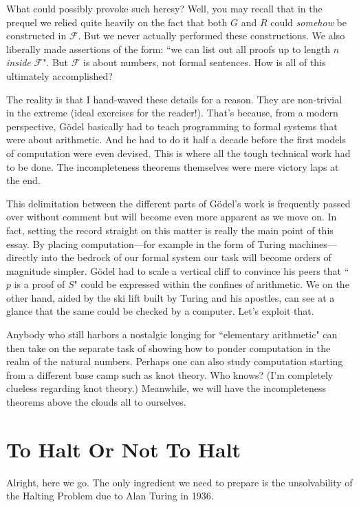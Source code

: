 \documentclass{article}
\newcommand{\F}{\ensuremath{\mathcal{F}}}
\begin{document}
What could possibly provoke such heresy? Well, you may recall that in the prequel we relied quite heavily on the fact that both $G$ and $R$ could \textit{somehow} be constructed in $\F$. But we never actually performed these constructions. We also liberally made assertions of the form: ``we can list out all proofs up to length $n$ \textit{inside} $\F$". But $\F$ is about numbers, not formal sentences. How is all of this ultimately accomplished?

The reality is that I hand-waved these details for a reason. They are non-trivial in the extreme (ideal exercises for the reader!). That's because, from a modern perspective, Gödel basically had to teach programming to formal systems that were about arithmetic. And he had to do it half a decade before the first models of computation were even devised. This is where all the tough technical work had to be done. The incompleteness theorems themselves were mere victory laps at the end.

This delimitation between the different parts of Gödel's work is frequently passed over without comment but will become even more apparent as we move on. In fact, setting the record straight on this matter is really the main point of this essay. By placing computation---for example in the form of Turing machines---directly into the bedrock of our formal system our task will become orders of magnitude simpler. Gödel had to scale a vertical cliff to convince his peers that ``$p$ is a proof of $S$" could be expressed within the confines of arithmetic. We on the other hand, aided by the ski lift built by Turing and his apostles, can see at a glance that the same could be checked by a computer. Let's exploit that.

Anybody who still harbors a nostalgic longing for ``elementary arithmetic" can then take on the separate task of showing how to ponder computation in the realm of the natural numbers. Perhaps one can also study computation starting from a different base camp such as knot theory. Who knows? (I'm completely clueless regarding knot theory.) Meanwhile, we will have the incompleteness theorems above the clouds all to ourselves.

\section{To Halt Or Not To Halt}

Alright, here we go. The only ingredient we need to prepare is the unsolvability of the Halting Problem due to Alan Turing in 1936.
\end{document}
